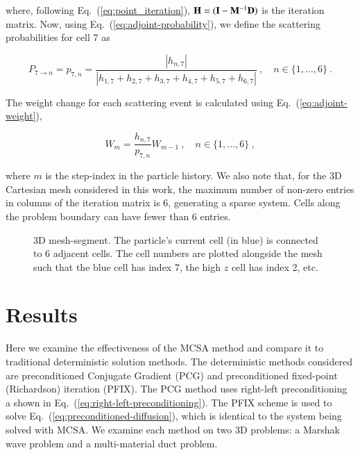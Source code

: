 \documentclass[preprint,12pt]{elsarticle}
\newcommand{\vI}{\ensuremath{\ve{I}}}
\begin{document}
where, following Eq.~(\ref{eq:point_iteration}), $\ve{H} = (\vI -
\ve{M}^{-1}\ve{D})$ is the iteration matrix.  Now, using
Eq.~(\ref{eq:adjoint-probability}), we define the scattering
probabilities for cell 7 as

\begin{equation*}
  P_{7\rightarrow n} = p_{7,n} = \frac{|h_{n,7}|}{|h_{1,7} + h_{2,7} +
    h_{3,7} + h_{4,7} + h_{5,7} + h_{6,7}|}\:,\quad n\in
  \{1,\ldots,6\}\:.
\end{equation*}

The weight change for each scattering event is calculated using
Eq.~(\ref{eq:adjoint-weight}),

\begin{equation*}
  W_{m} = \frac{h_{n,7}}{p_{7,n}}W_{m-1}\:,\quad n\in
  \{1,\ldots,6\}\:,
\end{equation*}

where $m$ is the step-index in the particle history.  We also note
that, for the 3D Cartesian mesh considered in this work, the maximum
number of non-zero entries in columns of the iteration matrix is 6,
generating a sparse system.  Cells along the problem boundary can have
fewer than 6 entries.

\begin{figure}[h!]
  \centerline{ }
  \caption{3D mesh-segment.  The particle's current cell (in blue) is
    connected to 6 adjacent cells.  The cell numbers are plotted
    alongside the mesh such that the blue cell has index 7, the high
    $z$ cell has index 2, etc.}
  \label{fig:mesh_segment}
\end{figure}

\section{Results}
\label{sec:results}

Here we examine the effectiveness of the MCSA method and compare it to
traditional deterministic solution methods.  The deterministic methods
considered are preconditioned Conjugate Gradient (PCG) and
preconditioned fixed-point (Richardson) iteration (PFIX).  The PCG
method uses right-left preconditioning a shown in
Eq.~(\ref{eq:right-left-preconditioning}).  The PFIX scheme is used to
solve Eq.~(\ref{eq:preconditioned-diffusion}), which is identical to
the system being solved with MCSA.  We examine each method on two 3D
problems: a Marshak wave problem and a multi-material duct problem.
\end{document}
